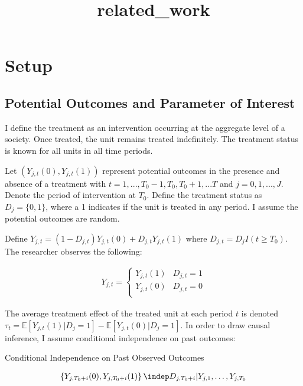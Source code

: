 \documentclass[
]{article}
\title{related\_work}
\author{}
\date{\vspace{-2.5em}}
\begin{document}
\maketitle

\hypertarget{setup}{%
\section{Setup}\label{setup}}

\hypertarget{potential-outcomes-and-parameter-of-interest}{%
\subsection{Potential Outcomes and Parameter of
Interest}\label{potential-outcomes-and-parameter-of-interest}}

I define the treatment as an intervention occurring at the aggregate
level of a society. Once treated, the unit remains treated indefinitely.
The treatment status is known for all units in all time periods.

Let \(\left(Y_{j,t}(0),Y_{j,t}(1)\right)\) represent potential outcomes
in the presence and absence of a treatment with
\(t=1,...,T_{0}-1,T_0,T_{0}+1,...T\) and \(j=0,1,...,J\). Denote the
period of intervention at \(T_0\). Define the treatment status as
\(D_j=\{0,1\}\), where a 1 indicates if the unit is treated in any
period. I assume the potential outcomes are random.

Define \(Y_{j,t}=(1-D_{j,t})Y_{j,t}(0)+D_{j,t}Y_{j,t}(1)\) where
\(D_{j,t}=D_jI(t \ge T_0)\). The researcher observes the following:

\begin{align}
Y_{j,t}= \begin{cases}
Y_{j,t}(1) & D_{j,t}=1\\
Y_{j,t}(0) & D_{j,t}=0\\
\end{cases}
\end{align}

The average treatment effect of the treated unit at each period \(t\) is
denoted
\(\tau_{t}=\mathbb{E}[Y_{j,t}(1)|D_j=1]-\mathbb{E}[Y_{j,t}(0)|D_j=1]\).
In order to draw causal inference, I assume conditional independence on
past outcomes:

\begin{assumption}
Conditional Independence on Past Observed Outcomes
\end{assumption}

\begin{align}
\left\{Y_{j,T_0+i}(0),Y_{j,T_0+i}(1)\right\} \indep D_{j,T_0+i} | Y_{j,1},\dots,Y_{j,T_0}
\label{eq:ass_2}
\end{align}
\end{document}
